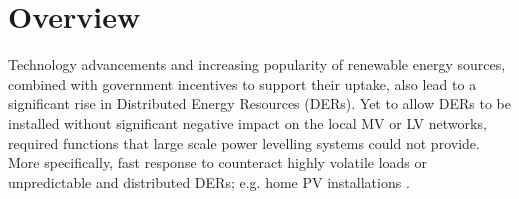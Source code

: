\section{Overview}
\label{ch-review:sec:overview}


Technology advancements and increasing popularity of renewable energy sources, combined with government incentives to support their uptake, also lead to a significant rise in Distributed Energy Resources (DERs).
Yet to allow DERs to be installed without significant negative impact on the local MV or LV networks, required functions that large scale power levelling systems could not provide. More specifically, fast response to counteract highly volatile loads or unpredictable and distributed DERs; e.g. home PV installations \cite{Jewell1987}. 
